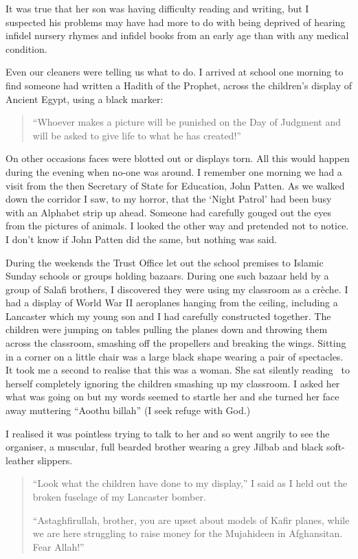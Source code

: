 \documentclass[12pt]{memoir}
\begin{document}
It was true that her son was having difficulty reading and writing,
but I suspected his problems may have had more to do with being deprived of
hearing infidel nursery rhymes and infidel books
from an early age than with any medical condition.

Even our cleaners were telling us what to do.
I arrived at school one morning to find someone
had written a Hadith of the Prophet,
across the children’s display of Ancient Egypt, using a black marker:

\begin{quote}
“Whoever makes a picture will be punished on the Day of Judgment
and will be asked to give life to what he has created!”
\end{quote}

On other occasions faces were blotted out or displays torn.
All this would happen during the evening when no-one was around.
I remember one morning we had a visit
from the then Secretary of State for Education, John Patten.
As we walked down the corridor I saw, to my horror,
that the ‘Night Patrol’ had been busy with an Alphabet strip up ahead.
Someone had carefully gouged out the eyes from the pictures of animals.
I looked the other way and pretended not to notice.
I don’t know if John Patten did the same, but nothing was said.

During the weekends the Trust Office let out the school premises
to Islamic Sunday schools or groups holding bazaars.
During one such bazaar held by a group of Salafi brothers,
I discovered they were using my classroom as a crèche.
I had a display of World War II aeroplanes hanging from the ceiling,
including a Lancaster  which my young son and I
had carefully constructed together.
The children were jumping on tables pulling the planes down
and throwing them across the classroom,
smashing off the propellers and breaking the wings.
Sitting in a corner on a little chair was a large black shape
wearing a pair of spectacles.
It took me a second to realise that this was a woman.
She sat silently reading \Quran\ to herself
completely ignoring the children smashing up my classroom.
I asked her what was going on but my words seemed
to startle her and she turned her face away
muttering “Aoothu billah” (I seek refuge with God.)

I realised it was pointless trying to talk to her
and so went angrily to see the organiser, a muscular,
full bearded brother wearing a grey Jilbab and black soft-leather slippers.

\begin{quote}
“Look what the children have done to my display,”
I said as I held out the broken fuselage of my Lancaster bomber.

“Astaghfirullah, brother, you are upset about models of Kafir planes,
while we are here struggling to raise money for the Mujahideen in Afghansitan.
Fear Allah!”
\end{quote}
\end{document}
